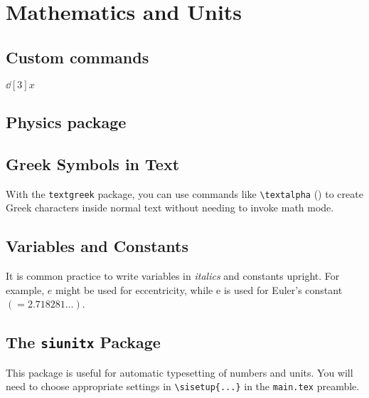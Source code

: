 \section{Mathematics and Units}

\subsection{Custom commands}



 $\dd[3]{x}$

\subsection{Physics package}

\subsection{Greek Symbols in Text}

With the \verb|textgreek| package, you can use commands like \verb|\textalpha| (\textalpha) to create Greek characters inside normal text without needing to invoke math mode.

\subsection{Variables and Constants}

It is common practice to write variables in \textit{italics} and constants upright. For example, $e$ might be used for eccentricity, while $\mathrm{e}$ is used for Euler's constant $(=\num{2.718281}\dots)$.


\subsection{The \texttt{siunitx} Package}

This package is useful for automatic typesetting of numbers and units. You will need to choose appropriate settings in \verb|\sisetup{...}| in the \verb|main.tex| preamble. %

